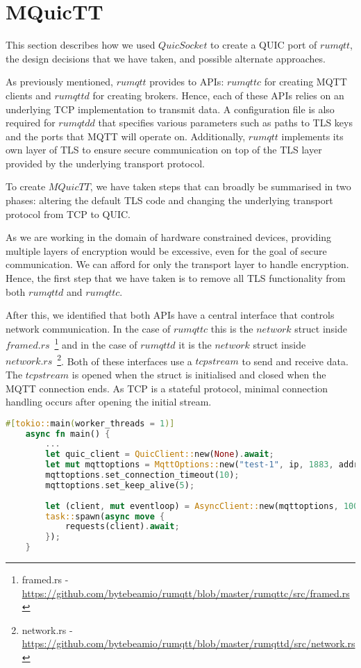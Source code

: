 \section{MQuicTT} \label{chap:port}

This section describes how we used $QuicSocket$ to create a QUIC port of $rumqtt$, the design decisions that we have taken, and possible alternate approaches.

As previously mentioned, $rumqtt$ provides to APIs: $rumqttc$ for creating MQTT clients and $rumqttd$ for creating brokers.
Hence, each of these APIs relies on an underlying TCP implementation to transmit data.
A configuration file is also required for $rumqtdd$ that specifies various parameters such as paths to TLS keys and the ports that MQTT will operate on.
Additionally, $rumqtt$ implements its own layer of TLS to ensure secure communication on top of the TLS layer provided by the underlying transport protocol.

To create $MQuicTT$, we have taken steps that can broadly be summarised in two phases: altering the default TLS code and changing the underlying transport protocol from TCP to QUIC.

As we are working in the domain of hardware constrained devices, providing multiple layers of encryption would be excessive, even for the goal of secure communication.
We can afford for only the transport layer to handle encryption.
Hence, the first step that we have taken is to remove all TLS functionality from both $rumqttd$ and $rumqttc$.

After this, we identified that both APIs have a central interface that controls network communication.
In the case of $rumqttc$ this is the $network$ struct inside $framed.rs$~\footnote{framed.rs - \url{https://github.com/bytebeamio/rumqtt/blob/master/rumqttc/src/framed.rs}} and in the case of $rumqttd$ it is the $network$ struct inside $network.rs$~\footnote{network.rs - \url{https://github.com/bytebeamio/rumqtt/blob/master/rumqttd/src/network.rs}}.
Both of these interfaces use a $tcpstream$ to send and receive data.
The $tcpstream$ is opened when the struct is initialised and closed when the MQTT connection ends.
As TCP is a stateful protocol, minimal connection handling occurs after opening the initial stream.

\begin{lstlisting}[language=Rust, caption={An example of initialising an MQuicTT client. The QUIC connection is established by initialising a $QuicClient$ and the resulting client is passed as an MQTT option.}, label=lst:MQuicTT:client]
    #[tokio::main(worker_threads = 1)]
    async fn main() {
        ...
        let quic_client = QuicClient::new(None).await;
        let mut mqttoptions = MqttOptions::new("test-1", ip, 1883, addr, quic_client);
        mqttoptions.set_connection_timeout(10);
        mqttoptions.set_keep_alive(5);
    
        let (client, mut eventloop) = AsyncClient::new(mqttoptions, 100);
        task::spawn(async move {
            requests(client).await;
        });
    }
\end{lstlisting}

